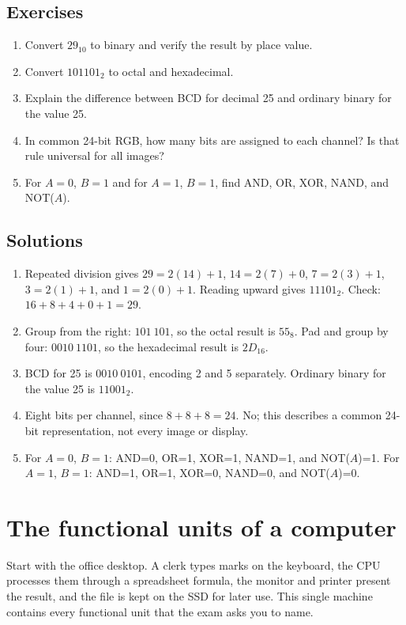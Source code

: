 \subsection*{Exercises}
\begin{enumerate}[label=\arabic*.]
  \item Convert $29_{10}$ to binary and verify the result by place value.
  \item Convert $101101_2$ to octal and hexadecimal.
  \item Explain the difference between BCD for decimal 25 and ordinary
    binary for the value 25.
  \item In common 24-bit RGB, how many bits are assigned to each channel?
    Is that rule universal for all images?
  \item For $A=0$, $B=1$ and for $A=1$, $B=1$, find AND, OR, XOR, NAND,
    and NOT($A$).
\end{enumerate}

\subsection*{Solutions}
\begingroup\small
\begin{enumerate}[label=\arabic*.]
  \item Repeated division gives $29=2(14)+1$, $14=2(7)+0$,
    $7=2(3)+1$, $3=2(1)+1$, and $1=2(0)+1$. Reading upward gives
    $11101_2$. Check: $16+8+4+0+1=29$.
  \item Group from the right: $101\ 101$, so the octal result is $55_8$.
    Pad and group by four: $0010\ 1101$, so the hexadecimal result is
    $2D_{16}$.
  \item BCD for 25 is $0010\ 0101$, encoding 2 and 5 separately.
    Ordinary binary for the value 25 is $11001_2$.
  \item Eight bits per channel, since $8+8+8=24$. No; this describes a
    common 24-bit representation, not every image or display.
  \item For $A=0$, $B=1$: AND=0, OR=1, XOR=1, NAND=1, and NOT($A$)=1.
    For $A=1$, $B=1$: AND=1, OR=1, XOR=0, NAND=0, and NOT($A$)=0.
\end{enumerate}
\endgroup

\section{The functional units of a computer}
Start with the office desktop. A clerk types marks on the keyboard, the CPU
processes them through a spreadsheet formula, the monitor and printer present
the result, and the file is kept on the SSD for later use. This single machine
contains every functional unit that the exam asks you to name.

